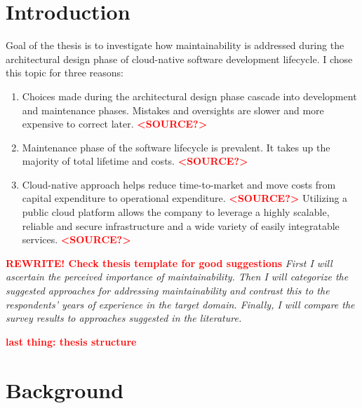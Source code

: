 \documentclass[utf8,english]{gradu3}
\newcommand{\todo}[1]{\textbf{\textcolor{red}{#1}}}
\newcommand{\tmp}[1]{\textit{{#1}}}
\begin{document}
\chapter{Introduction}


Goal of the thesis is to investigate how maintainability is addressed during
the architectural design phase of cloud-native software development lifecycle.
I chose this topic for three reasons:
\begin{enumerate}
  \item Choices made during the architectural design phase cascade into
        development and maintenance phases.
        Mistakes and oversights are slower and more expensive to correct later. \todo{<SOURCE?>}
  \item Maintenance phase of the software lifecycle is prevalent.
        It takes up the majority of total lifetime and costs. \todo{<SOURCE?>}
  \item Cloud-native approach helps reduce time-to-market and move costs from
        capital expenditure to operational expenditure. \todo{<SOURCE?>}
        Utilizing a public cloud platform allows the company to leverage a
        highly scalable, reliable and secure infrastructure and a wide variety
        of easily integratable services. \todo{<SOURCE?>}
\end{enumerate}

\todo{REWRITE! Check thesis template for good suggestions}
\tmp{First I will ascertain the perceived importance of maintainability.
Then I will categorize the suggested approaches for addressing maintainability
and contrast this to the respondents' years of experience in the target domain.
Finally, I will compare the survey results to approaches suggested in the literature.}

\todo{last thing: thesis structure}


\chapter{Background}
\end{document}
